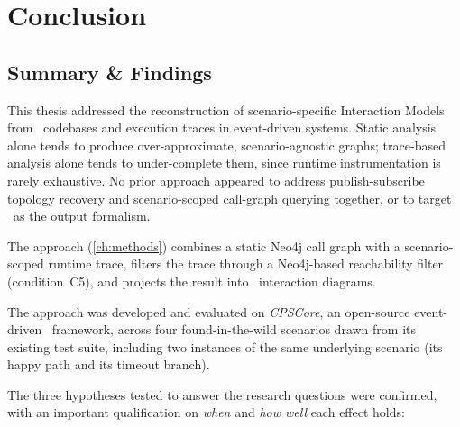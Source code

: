 \chapter{Conclusion}\label{ch:conclusion}

\section{Summary \& Findings}

This thesis addressed the reconstruction of scenario-specific Interaction
Models from \Cpp\ codebases and execution traces in event-driven systems.
Static analysis alone tends to produce over-approximate, scenario-agnostic
graphs; trace-based analysis alone tends to under-complete them, since
runtime instrumentation is rarely exhaustive. No prior approach appeared
to address publish-subscribe topology recovery and scenario-scoped
call-graph querying together, or to target \sysml\ as the output
formalism.

The approach (\cref{ch:methods}) combines a static Neo4j call graph
with a scenario-scoped runtime trace, filters the trace through a
Neo4j-based reachability filter (condition~C5), and projects the
result into \sysml\ interaction diagrams.

The approach was developed and evaluated on \emph{CPSCore}, an
open-source event-driven \Cpp\ framework, across four found-in-the-wild
scenarios drawn from its existing test suite, including two instances of
the same underlying scenario (its happy path and its timeout branch).

The three hypotheses tested to answer the research questions were
confirmed, with an important qualification on \emph{when} and
\emph{how well} each effect holds:

